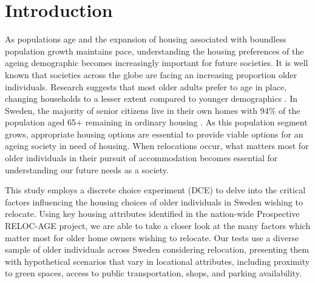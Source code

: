 \documentclass[3p,11pt ]{elsarticle}
\begin{document}
\begin{frontmatter}
\begin{abstract}
\end{abstract}
%
%
%
%
\end{frontmatter}


\newpage



\section{Introduction}

As populations age and the expansion of housing associated with boundless population growth maintains pace,
understanding the housing preferences of the ageing demographic becomes increasingly important for future societies.
It is well known that societies across the globe are facing an increasing proportion older individuals.
Research suggests that most older adults prefer to age in place,
changing households to a lesser extent compared to younger demographics  \citep{abramssonChangingLocationsCentral2015}.
In Sweden, the majority of senior citizens live in their own homes with 94\% of the population aged 65+ remaining in ordinary housing \citep{jennbertDevelopmentsElderlyPolicy2009}.
As this population segment grows,
appropriate housing options are essential to provide viable options for an ageing society in need of housing.
When relocations occur,
what matters most for older individuals in their pursuit of accommodation becomes essential for understanding our future needs as a society.

This study employs a discrete choice experiment (DCE) to delve into the critical factors influencing the housing choices of older individuals in Sweden wishing to relocate.
Using key housing attributes identified in the nation-wide Prospective RELOC-AGE project,
we are able to take a closer look at the many factors which matter most for older home owners wishing to relocate.
Our tests use a diverse sample of older individuals across Sweden considering relocation, presenting them with hypothetical scenarios that vary in locational attributes, including proximity to green spaces, access to public transportation, shops, and parking availability.
\end{document}
